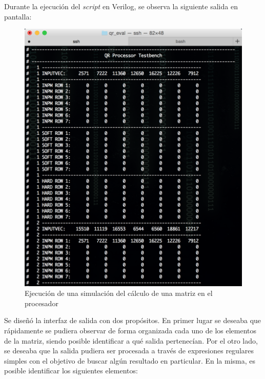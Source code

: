 \newpage

Durante la ejecución del \textit{script} en Verilog, se observa la siguiente salida en pantalla:

\begin{figure}[!h]
  \begin{center}
    \includegraphics[width=11 cm]{./figures/C05-qr_eval_terminal_1}
    \caption{Ejecución de una simulación del cálculo de una matriz en el procesador}
    \label{fig:qr_eval_terminal_1}
  \end{center}
\end{figure}

Se diseñó la interfaz de salida con dos propósitos. En primer lugar se deseaba que rápidamente se pudiera observar de forma organizada cada uno de los elementos de la matriz, siendo posible identificar a qué salida pertenecían. Por el otro lado, se deseaba que la salida pudiera ser procesada a través de expresiones regulares simples con el objetivo de buscar algún resultado en particular. En la misma, es posible identificar los siguientes elementos:

\newpage

